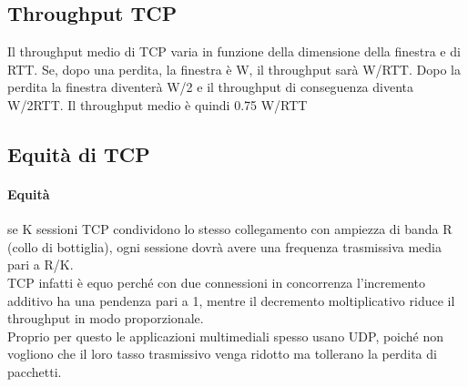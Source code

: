 \documentclass{report}
\begin{document}
	\subsection{Throughput TCP}
	Il throughput medio di TCP varia in funzione della dimensione della finestra e di RTT. Se, dopo una perdita, la finestra è W, il throughput sarà W/RTT. Dopo la perdita la finestra diventerà W/2 e il throughput di conseguenza diventa W/2RTT. Il throughput medio è quindi 0.75 W/RTT
	\subsection{Equità di TCP}
	\paragraph{Equità} se K sessioni TCP condividono lo stesso collegamento con ampiezza di banda R (collo di bottiglia), ogni sessione dovrà avere una frequenza trasmissiva media pari a R/K.
	\medskip\\TCP infatti è equo perché con due connessioni in concorrenza l'incremento additivo ha una pendenza pari a 1, mentre il decremento moltiplicativo riduce il throughput in modo proporzionale.
	\medskip\\Proprio per questo le applicazioni multimediali spesso usano UDP, poiché non vogliono che il loro tasso trasmissivo venga ridotto ma tollerano la perdita di pacchetti.
	
\end{document}
